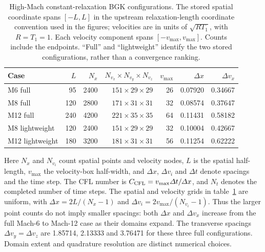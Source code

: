 \documentclass[lineno,paper]{JFM-FLM_Au}
\newenvironment{revision}{\nolinenumbers\begin{tcolorbox}[breakable,colback=revisionyellow,colframe=revisionyellow,boxrule=0pt,arc=0pt,left=5pt,right=5pt,top=5pt,bottom=5pt,before skip=6pt,after skip=6pt]\captionsetup{width=\linewidth}}{\end{tcolorbox}\linenumbers}
\newcommand{\revisionbox}[1]{\colorbox{revisionyellow}{#1}}
\newenvironment{revision}{}{}
\newcommand{\revisionbox}[1]{#1}
\begin{document}
\begin{table}
\centering
\begingroup\setlength{\fboxsep}{5pt}
\revisionbox{\begin{minipage}{0.92\textwidth}\captionsetup{width=\linewidth}
\caption{High-Mach constant-relaxation BGK configurations. The stored spatial coordinate spans $[-L,L]$ in the upstream relaxation-length coordinate convention used in the figures; velocities are in units of $\sqrt{RT_1}$, with $R=T_1=1$. Each velocity component spans $[-v_{\max},v_{\max}]$. Counts include the endpoints. ``Full'' and ``lightweight'' identify the two stored configurations, rather than a convergence ranking.}
\label{tab:high_mach_grids}
\centering\small\setlength{\tabcolsep}{3.5pt}
\begin{tabular}{lrrrrrr}
\toprule
Case & $L$ & $N_x$ & $N_{v_x}\times N_{v_y}\times N_{v_z}$ & $v_{\max}$ & $\Delta x$ & $\Delta v_x$\\
\midrule
M6 full & 95 & 2400 & $151\times29\times29$ & 26 & 0.07920 & 0.34667\\
M8 full & 120 & 2800 & $171\times31\times31$ & 32 & 0.08574 & 0.37647\\
M12 full & 240 & 4200 & $221\times35\times35$ & 64 & 0.11431 & 0.58182\\
\midrule
M8 lightweight & 120 & 2400 & $151\times29\times29$ & 32 & 0.10004 & 0.42667\\
M12 lightweight & 180 & 3200 & $181\times31\times31$ & 56 & 0.11254 & 0.62222\\
\bottomrule
\end{tabular}
\end{minipage}}\par\endgroup
\end{table}

\begin{revision}
Here $N_x$ and $N_{v_i}$ count spatial points and velocity nodes,
$L$ is the spatial half-length, $v_{\max}$ the velocity-box half-width,
and $\Delta x$, $\Delta v_i$ and $\Delta t$ denote spacings and the
time step. The CFL number is $C_{\rm CFL}=v_{\max}\Delta t/\Delta x$,
and $N_t$ denotes the completed number of time steps.
The spatial and velocity grids in table~\ref{tab:high_mach_grids} are uniform, with $\Delta x=2L/(N_x-1)$ and $\Delta v_i=2v_{\max}/(N_{v_i}-1)$. Thus the larger point counts do not imply smaller spacings: both $\Delta x$ and $\Delta v_x$ increase from the full Mach-6 to Mach-12 case as their domains expand. The transverse spacings $\Delta v_y=\Delta v_z$ are 1.85714, 2.13333 and 3.76471 for these three full configurations. Domain extent and quadrature resolution are distinct numerical choices.
\end{revision}
\end{document}
